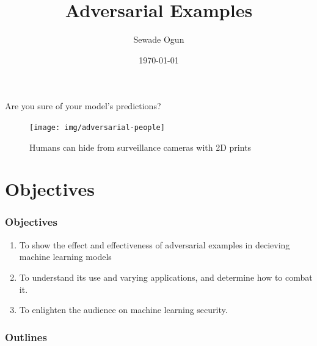 \documentclass[12pt]{beamer}
\begin{document}
	\pagestyle{plain}
	\addtocounter{framenumber}{-1}
	\author{Sewade Ogun}
	\title{Adversarial Examples}
	\date{\today}
	\begin{frame}[plain]
	\maketitle
\end{frame}

\begin{frame}
	\Large{Are you sure of your model's predictions?}
	\begin{figure}
		\centering
		\texttt{[image: img/adversarial-people]}
		\label{fig:adversarial-people}
		\caption{Humans can hide from surveillance cameras with 2D prints\protect\footnotemark}
	\end{figure}

\end{frame}

\section{Objectives}
\begin{frame}
\frametitle{Objectives}
\begin{enumerate}
	\item To show the effect and effectiveness of adversarial examples in decieving machine learning models
	\item To understand its use and varying applications, and determine how to combat it.
	\item To enlighten the audience on machine learning security.
\end{enumerate}

\end{frame}

\begin{frame}
	\frametitle{Outlines}
	\tableofcontents
\end{frame}
\end{document}
